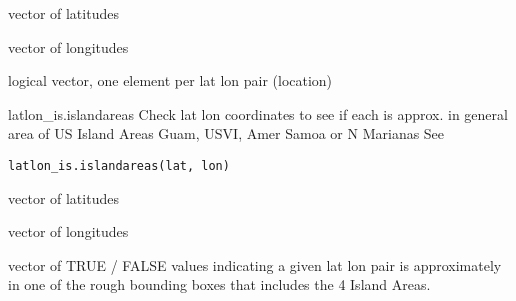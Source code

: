 \documentclass[a4paper]{book}
\begin{document}
%
\begin{Arguments}
\begin{ldescription}
\item[\code{lat}] vector of latitudes

\item[\code{lon}] vector of longitudes
\end{ldescription}
\end{Arguments}
%
\begin{Value}
logical vector, one element per lat lon pair (location)
\end{Value}
%
\begin{SeeAlso}\relax
{}   
\end{SeeAlso}
%
\begin{Description}\relax
latlon\_is.islandareas
Check lat lon coordinates to see if each is approx. in general area of US Island Areas Guam, USVI, Amer Samoa or N Marianas
See 
\end{Description}
%
\begin{Usage}
\begin{verbatim}
latlon_is.islandareas(lat, lon)
\end{verbatim}
\end{Usage}
%
\begin{Arguments}
\begin{ldescription}
\item[\code{lat}] vector of latitudes

\item[\code{lon}] vector of longitudes
\end{ldescription}
\end{Arguments}
%
\begin{Value}
vector of TRUE / FALSE values indicating a given lat lon pair
is approximately in one of the rough bounding boxes that includes the 4 Island Areas.
\end{Value}
%
\begin{SeeAlso}\relax
{}   
\end{SeeAlso}
\end{document}
